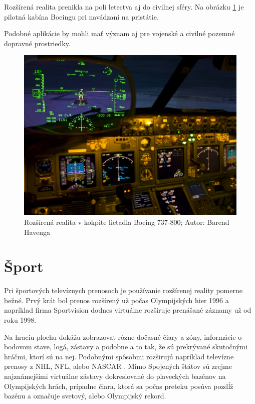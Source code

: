 Rozšírená realita prenikla na poli letectva aj do civilnej sféry. Na obrázku \ref{boeing} je pilotná kabína Boeingu pri navádzaní na pristátie.
 
Podobné aplikácie by mohli mať význam aj pre vojenské a civilné pozemné dopravné prostriedky.

\begin{figure}[h]
 \centering
 \includegraphics[max width=\textwidth]{pictures/kokpit.jpg}
 \caption{Rozšírená realita v kokpite lietadla Boeing 737-800; Autor: Barend Havenga \cite{Havenga}}
 \label{boeing}
\end{figure}

\section{Šport}

Pri športových televíznych prenosoch je používanie rozšírenej reality pomerne bežné. Prvý krát bol prenos rozšírený už počas Olympijských hier 1996 a napríklad firma Sportvision dodnes virtuálne rozširuje prenášané záznamy už od roku 1998.

Na hraciu plochu dokážu zobrazovať rôzne dočasné čiary a zóny, informácie o bodovom stave, logá, zástavy a podobne a to tak, že sú prekrývané skutočnými hráčmi, ktorí sú na nej. Podobnými spôsobmi rozširujú napríklad televízne prenosy z NHL, NFL, alebo NASCAR \cite{Sportvision, Ismert12}. Mimo Spojených štátov sú zrejme najznámejšími virtuálne zástavy dokreslované do plaveckých bazénov na Olympijských hrách, prípadne čiara, ktorá sa počas preteku posúva pozdĺž bazénu a označuje svetový, alebo Olympijský rekord.

